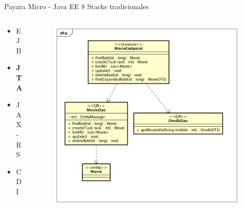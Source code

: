 \documentclass[aspectratio=169]{beamer}
\begin{document}
\begin{frame}{Payara Micro - Java EE 8}
Stacks tradicionales
\begin{columns}[T] %
\begin{column}[T]{3cm} %
	\begin{itemize}
		\item EJB
		\item \textbf{JTA}
		\item JAX-RS
		\item CDI
	\end{itemize}
\end{column}
\begin{column}[T]{7cm} %
	\begin{figure}
		\centering
		\includegraphics[width=0.9\linewidth]{Images/democlass}
	\end{figure}
\end{column}
\end{columns}
\end{frame}
\end{document}
